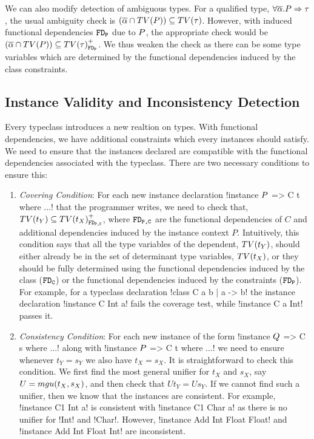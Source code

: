 \documentclass[format=acmsmall,manuscript,review,screen,nonacm,margin=1in,11pt]{acmart}
\begin{document}
We can also modify detection of ambiguous types.
For a qualified type, $\forall\overline{\alpha}.P\Rightarrow\tau$, the usual ambiguity
check is $(\overline{\alpha}\cap TV(P)) \subseteq TV(\tau)$. However,
with induced functional dependencies $\texttt{FD}_\texttt{P}$ due to $P$,
the appropriate check would be $(\overline{\alpha}\cap TV(P))
\subseteq {TV(\tau)}^{+}_{\texttt{FD}_\texttt{P}}$. We thus weaken the check
as there can be some type variables which are determined
by the functional dependencies induced by the class constraints.

\subsection{Instance Validity and Inconsistency Detection}
Every typeclass introduces a new realtion on types. With functional dependencies,
we have additional constraints which every instances should satisfy.
We need to ensure that the instances declared are compatible
with the functional dependencies associated with the typeclass.
There are two necessary conditions to ensure this:
\begin{enumerate}[topsep={0pt},partopsep={0pt}]
\item\emph{Covering Condition}:  For each new instance declaration !instance $P$ => C t where ...!
  that the programmer writes, we need to check that,%
  $TV(t_Y) \subseteq {TV(t_X)}^{+}_{\texttt{FD}_\texttt{{P,C}}}$,
  where $\texttt{FD}_\texttt{{P,C}}$ are the functional dependencies of $C$ and additional dependencies
  induced by the instance context $P$. Intuitively, this condition says that
  all the type variables of the dependent, $TV(t_Y)$, should either already be in the
  set of determinant type variables, $TV(t_X)$, or they should be fully determined using the
  functional dependencies induced by the class ($\texttt{FD}_\texttt{C}$) or the functional dependencies
  induced by the constraints ($\texttt{FD}_\texttt{P}$). For example, for a typeclass declaration
  !class C a b |  a -> b! the instance declaration !instance C Int a! fails the coverage test,
  while !instance C a Int! passes it.
\item\emph{Consistency Condition}: For each new instance of the form !instance $Q$ => C s where ...!
  along with !instance $P$ => C t where ...! we need to ensure whenever $t_Y = s_Y$ we also have $t_X = s_X$.
  It is straightforward to check this condition. We first find the most general unifier for $t_X$ and $s_X$,
  say $U=mgu(t_X,s_X) $, and then check that $U t_Y = U s_Y$. If we cannot find such a unifier, then we know that
  the instances are consistent. For example, !instance C1 Int a! is consistent with !instance C1 Char a!
  as there is no unifier for !Int! and !Char!. However, !instance Add Int Float Float!
  and !instance Add Int Float Int! are inconsistent.%
\end{enumerate}
\end{document}
